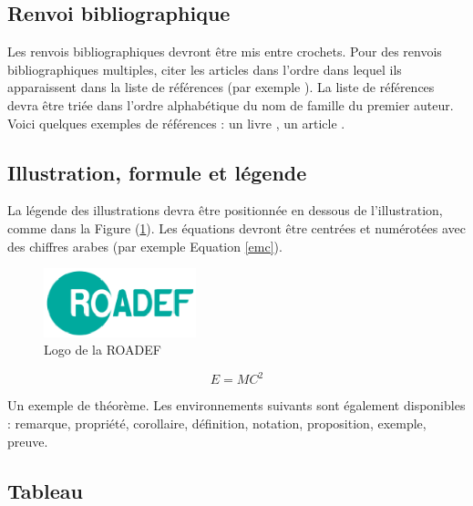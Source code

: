 \documentclass{roadef}
\begin{document}
\subsection{Renvoi bibliographique}

Les renvois bibliographiques devront être mis entre crochets. Pour des renvois bibliographiques multiples, citer les articles dans l'ordre dans lequel ils apparaissent dans la liste de références (par exemple \cite{toth02,kirkpatrick83}). La liste de références devra être triée dans l'ordre alphabétique du nom de famille du premier auteur. Voici quelques exemples de références : un livre  \cite{toth02}, un article  \cite{kirkpatrick83}.

\subsection{Illustration, formule et légende}

La légende des illustrations devra être positionnée en dessous de l'illustration, comme dans la Figure (\ref{logoRoadef}). Les équations devront être centrées et numérotées avec des chiffres arabes (par exemple Equation \ref{emc}).

\begin{figure}[!ht]
    \begin{center}
        \includegraphics[height=2cm,clip=true]{roadef_logo.eps}
        \caption[Fig]{Logo de la ROADEF}
        \label{logoRoadef}
    \end{center}
\end{figure}

\begin{equation}
E=MC^2\label{emc}
\end{equation}

\begin{theoreme}
  Un exemple de théorème. Les environnements suivants sont également disponibles : remarque, propriété, corollaire, définition, notation, proposition, exemple, preuve.
\end{theoreme}

\subsection{Tableau}
\end{document}

